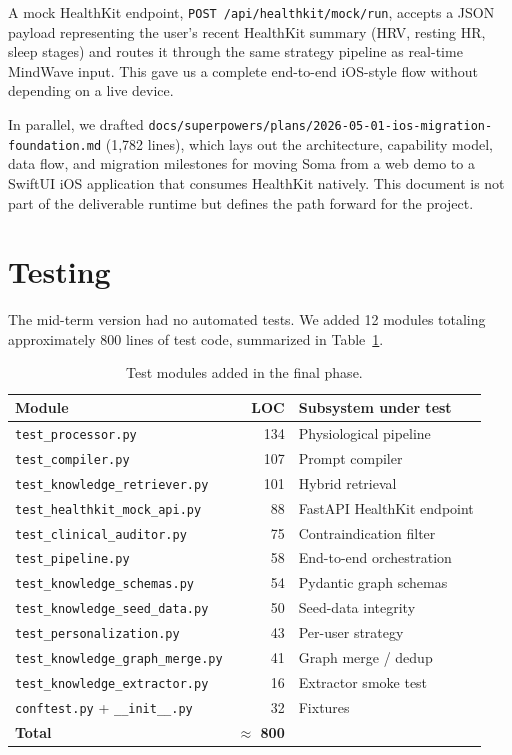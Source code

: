 \documentclass[11pt,a4paper]{article}
\begin{document}
A mock HealthKit endpoint, \texttt{POST /api/healthkit/mock/run}, accepts a
JSON payload representing the user's recent HealthKit summary (HRV, resting
HR, sleep stages) and routes it through the same strategy pipeline as
real-time MindWave input. This gave us a complete end-to-end iOS-style flow
without depending on a live device.

In parallel, we drafted
\texttt{docs/superpowers/plans/2026-05-01-ios-migration-foundation.md}
(1{,}782 lines), which lays out the architecture, capability model, data flow,
and migration milestones for moving Soma from a web demo to a SwiftUI iOS
application that consumes HealthKit natively. This document is not part of
the deliverable runtime but defines the path forward for the project.

\section{Testing}

The mid-term version had no automated tests. We added 12 modules totaling
approximately 800 lines of test code, summarized in
Table~\ref{tab:tests}.

\begin{table}[h]
\centering
\caption{Test modules added in the final phase.}
\label{tab:tests}
\begin{tabular}{lrl}
\toprule
\textbf{Module} & \textbf{LOC} & \textbf{Subsystem under test}\\
\midrule
\texttt{test\_processor.py}             & 134 & Physiological pipeline \\
\texttt{test\_compiler.py}              & 107 & Prompt compiler \\
\texttt{test\_knowledge\_retriever.py}  & 101 & Hybrid retrieval \\
\texttt{test\_healthkit\_mock\_api.py}  &  88 & FastAPI HealthKit endpoint \\
\texttt{test\_clinical\_auditor.py}     &  75 & Contraindication filter \\
\texttt{test\_pipeline.py}              &  58 & End-to-end orchestration \\
\texttt{test\_knowledge\_schemas.py}    &  54 & Pydantic graph schemas \\
\texttt{test\_knowledge\_seed\_data.py} &  50 & Seed-data integrity \\
\texttt{test\_personalization.py}       &  43 & Per-user strategy \\
\texttt{test\_knowledge\_graph\_merge.py}&  41 & Graph merge / dedup \\
\texttt{test\_knowledge\_extractor.py}  &  16 & Extractor smoke test \\
\texttt{conftest.py} + \texttt{\_\_init\_\_.py} & 32 & Fixtures \\
\midrule
\textbf{Total}                          & \textbf{$\approx$ 800} & \\
\bottomrule
\end{tabular}
\end{table}
\end{document}
